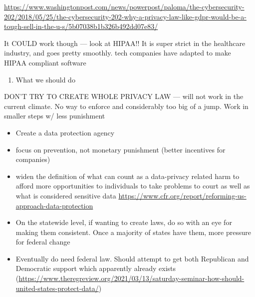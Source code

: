 \documentclass[water,article,submit,moreauthors,pdftex]{mdpi}
\providecommand{\tightlist}{%
  \setlength{\itemsep}{0pt}\setlength{\parskip}{4pt}}
\begin{document}
\url{https://www.washingtonpost.com/news/powerpost/paloma/the-cybersecurity-202/2018/05/25/the-cybersecurity-202-why-a-privacy-law-like-gdpr-would-be-a-tough-sell-in-the-u-s/5b07038b1b326b492dd07e83/}

It COULD work though --- look at HIPAA!! It is super strict in the
healthcare industry, and goes pretty smoothly. tech companies have
adapted to make HIPAA compliant software

\begin{enumerate}
\def\labelenumi{\arabic{enumi}.}
\setcounter{enumi}{6}
\tightlist
\item
  What we should do
\end{enumerate}

DON'T TRY TO CREATE WHOLE PRIVACY LAW --- will not work in the current
climate. No way to enforce and considerably too big of a jump. Work in
smaller steps w/ less punishment

\begin{itemize}
\tightlist
\item
  Create a data protection agency
\item
  focus on prevention, not monetary punishment (better incentives for
  companies)
\item
  widen the definition of what can count as a data-privacy related harm
  to afford more opportunities to individuals to take problems to court
  as well as what is considered sensitive data
  \url{https://www.cfr.org/report/reforming-us-approach-data-protection}
\item
  On the statewide level, if wanting to create laws, do so with an eye
  for making them consistent. Once a majority of states have them, more
  pressure for federal change
\item
  Eventually do need federal law. Should attempt to get both Republican
  and Democratic support which apparently already exists
  (\url{https://www.theregreview.org/2021/03/13/saturday-seminar-how-should-united-states-protect-data/})
\end{itemize}

%
\end{document}
